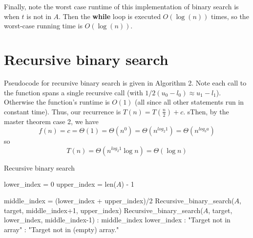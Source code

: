 \documentclass[paper=a4, fontsize=11pt]{scrartcl} %
\numberwithin{equation}{section} %
\numberwithin{figure}{section} %
\numberwithin{table}{section} %
\begin{document}
Finally, note the worst case runtime of this implementation of binary search is when $t$ is not in $A$. Then the 
\textbf{while} loop is executed $O(\log(n))$ times, so the worst-case running time is $O(\log(n))$.


\section{Recursive binary search}

Pseudocode for recursive binary search is given in Algorithm 2. Note each call to the function spans a single recursive call (with $1/2 (u_0 - l_0) \approx u_1 - l_1$). Otherwise the function's runtime is $O(1)$ (all since all other statements run in constant time). Thus, our recurrence is $T(n) = T\left(\frac{n}{2}\right) + c$. sThen, by the master theorem case 2, we have
\[f(n) = c = \Theta(1) = \Theta(n^{0}) = \Theta(n^{log_2 1}) = \Theta(n^{log_b a})\]
so
\[T(n) = \Theta(n^{log_2 1} \log n) =  \Theta( \log n) \]

\begin{algorithm}\small
\caption{Recursive binary search}
\label{itbs}
\begin{algorithmic}[1]
		\State lower\_index = 0
	\EndIf
		\State upper\_index = len($A$) - 1
	\EndIf
	
		\State middle\_index = (lower\_index + upper\_index)/2
			\State \Return Recursive\_binary\_search($A$, target, middle\_index+1, upper\_index)
			\State \Return Recursive\_binary\_search($A$, target, lower\_index, middle\_index-1)
		\Else:
			\State \Return middle\_index
		\EndIf
			\State \Return lower\_index
		\Else: 
			\State \Return "Target not in array"
		\EndIf
	\Else:
		\State \Return "Target not in (empty) array."
	\EndIf
\EndFunction
\end{algorithmic}
\end{algorithm}

\end{document}
